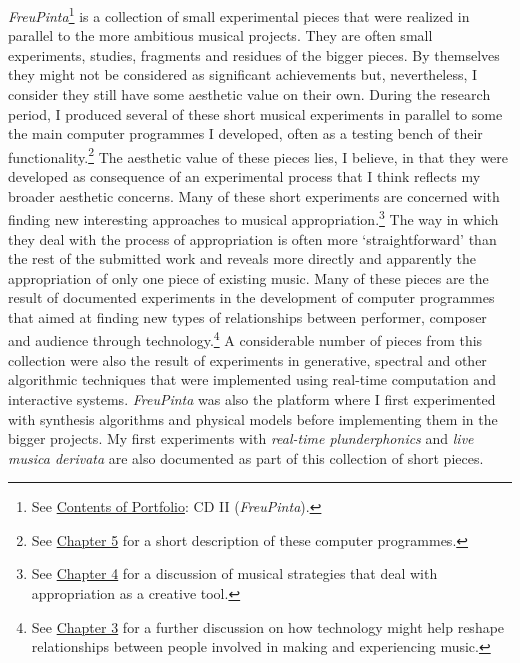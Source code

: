\emph{FreuPinta}\footnote{See \hyperlink{portfolio}{Contents of Portfolio}: CD II (\emph{FreuPinta}).} is a collection of small experimental pieces that were realized in parallel to the more ambitious musical projects. They are often small experiments, studies, fragments and residues of the bigger pieces. By themselves they might not be considered as significant achievements but, nevertheless, I consider they still have some aesthetic value on their own. During the research period, I produced several of these short musical experiments in parallel to some the main computer programmes I developed, often as a testing bench of their functionality.\footnote{See \hyperlink{chapter5}{Chapter 5} for a short description of these computer programmes.} The aesthetic value of these pieces lies, I believe, in that they were developed as consequence of an experimental process that I think reflects my broader aesthetic concerns. Many of these short experiments are concerned with finding new interesting approaches to musical appropriation.\footnote{See \hyperlink{chapter4}{Chapter 4} for a discussion of musical strategies that deal with appropriation as a creative tool.} The way in which they deal with the process of appropriation is often more `straightforward' than the rest of the submitted work and reveals more directly and apparently the appropriation of only one piece of existing music. Many of these pieces are the result of documented experiments in the development of computer programmes that aimed at finding new types of relationships between performer, composer and audience through technology.\footnote{See \hyperlink{chapter3}{Chapter 3} for a further discussion on how technology might help reshape relationships between people involved in making and experiencing music.} A considerable number of pieces from this collection were also the result of experiments in generative, spectral and other algorithmic techniques that were implemented using real-time computation and interactive systems. \emph{FreuPinta} was also the platform where I first experimented with synthesis algorithms and physical models before implementing them in the bigger projects. My first experiments with \emph{real-time plunderphonics} and \emph{live musica derivata} are also documented as part of this collection of short pieces.

